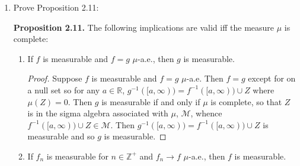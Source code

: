 \documentclass[11pt,oneside,english]{amsart}
\theoremstyle{definition}
\newcommand{\R}{\mathbb{R}}
\newcommand{\MC}[1]{\mathcal{#1}}
\begin{document}
\begin{enumerate}
\begin{enumerate}
\item There exists a Lebesgue measurable function $F$ and a continuous function $G$ on $\R$ such that $F\circ G$ is not Lebesgue measurable.

\begin{proof}
Let $F=\mathbbm{1}_B$ and $G=g^{-1}$ where $B$ and $g^{-1}$ are as in part (c) above. Then $F$ is Lebesgue measurable because the preimage of any infinite interval $[a,\infty)$ is either $\varnothing$ or $B$. $G$ is continuous as shown above in part (a). Now, $F\circ G:[0,2]\rightarrow \R$, so let $a<1$ be a real number, and we have

\begin{align*}
(F\circ G)^{-1}([a,\infty))&=(G^{-1}\circ F^{-1})([a,\infty))\\[2mm]
&=G^{-1}(F^{-1}([a,\infty))\\[2mm]
&=G^{-1}(B)\\[2mm]
&=(g^{-1})^{-1}(B)\\[2mm]
&=g(g^{-1}(A))\\[2mm]
&=A,
\end{align*}

which is Lebesgue nonmeasurable. Thus, $F\circ G$ is Lebesgue nonmeasurable.
\end{proof}

\end{enumerate}

\item Prove Proposition 2.11:

\textbf{Proposition 2.11.} The following implications are valid iff the measure $\mu$ is complete:
\begin{enumerate}
\item If $f$ is measurable and $f=g$ $\mu$-a.e., then $g$ is measurable.

\begin{proof}
Suppose $f$ is measurable and $f=g$ $\mu$-a.e. Then $f=g$ except for on a null set so for any $a\in\R$,  $g^{-1}([a,\infty))=f^{-1}([a,\infty))\cup Z$ where $\mu(Z)=0$. Then $g$ is measurable if and only if $\mu$ is complete, so that $Z$ is in the sigma algebra associated with $\mu$, $\MC{M}$, whence $f^{-1}([a,\infty))\cup Z\in\MC{M}$. Then $g^{-1}([a,\infty))=f^{-1}([a,\infty))\cup Z$ is measurable and so $g$ is measurable.
\end{proof}

\item If $f_n$ is measurable for $n\in\mathbb{Z}^+$ and $f_n\rightarrow f$ $\mu$-a.e., then $f$ is measurable.


\end{enumerate}
\end{enumerate}
\end{document}
